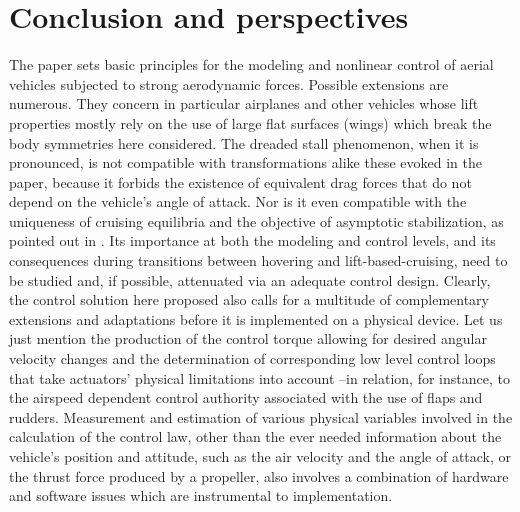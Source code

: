 \documentclass[twocolumn]{autart}
\theoremstyle{definition}
\theoremstyle{definition}
\begin{document}
\section{Conclusion and perspectives} \label{conclusion}
The paper sets basic principles for the modeling and nonlinear control of aerial vehicles subjected to strong aerodynamic forces. Possible extensions are numerous. 
They concern in particular airplanes and other vehicles whose lift properties mostly rely on the use of large flat surfaces (wings) which break the body symmetries here considered. The dreaded stall phenomenon, when it is pronounced, is not compatible with transformations alike these evoked in the paper, because it forbids the existence of equivalent drag forces that do not depend on the vehicle's angle of attack. Nor is it even compatible with the uniqueness of cruising equilibria and the objective of asymptotic stabilization, as pointed out in \cite{2012_PUCCI}. Its importance at both the modeling and control levels, and its consequences during transitions between hovering and lift-based-cruising, need to be studied and, if possible, attenuated via an adequate control design. Clearly, the control solution here proposed also calls for a multitude of complementary extensions and adaptations before it is implemented on a physical device.  Let us just mention the production of the control torque allowing for 
desired angular velocity changes and the determination of corresponding low level control loops that take actuators' physical limitations into account --in relation, for instance, to the airspeed dependent control authority associated with the use of flaps and rudders. Measurement and estimation of various physical variables involved in the calculation of the control law, other than the ever needed information about the vehicle's position and attitude, such as the air velocity and the angle of attack, or the thrust force produced by a propeller, also involves a combination of hardware and software issues which are instrumental to implementation.     

                   
\end{document}
